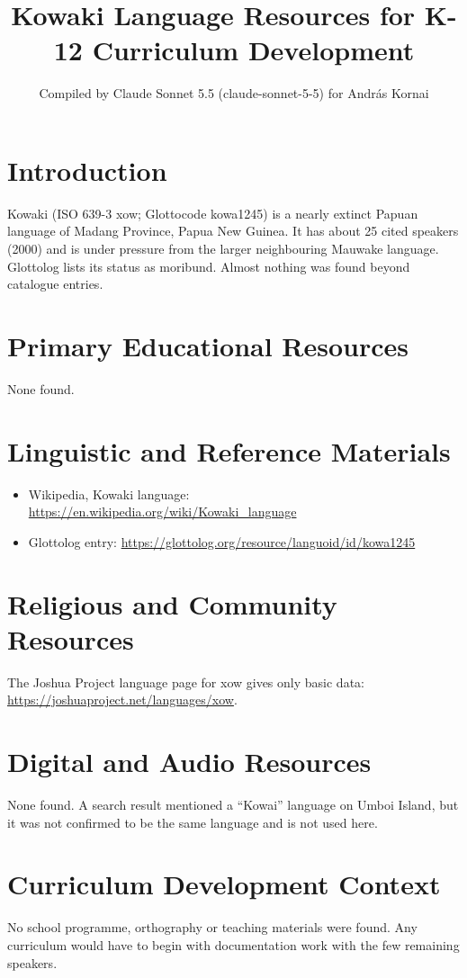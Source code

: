 \documentclass[12pt]{article}
\title{Kowaki Language Resources for K-12 Curriculum Development}
\author{Compiled by Claude Sonnet 5.5 (claude-sonnet-5-5) for Andr\'as Kornai}
\date{}
\begin{document}
\maketitle
\section{Introduction}
Kowaki (ISO 639-3 xow; Glottocode kowa1245) is a nearly extinct Papuan language of Madang Province, Papua New Guinea. It has about 25 cited speakers (2000) and is under pressure from the larger neighbouring Mauwake language. Glottolog lists its status as moribund. Almost nothing was found beyond catalogue entries.

\section{Primary Educational Resources}
None found.

\section{Linguistic and Reference Materials}
\begin{itemize}
\item Wikipedia, Kowaki language: \url{https://en.wikipedia.org/wiki/Kowaki_language}
\item Glottolog entry: \url{https://glottolog.org/resource/languoid/id/kowa1245}
\end{itemize}

\section{Religious and Community Resources}
The Joshua Project language page for xow gives only basic data: \url{https://joshuaproject.net/languages/xow}.

\section{Digital and Audio Resources}
None found. A search result mentioned a ``Kowai'' language on Umboi Island, but it was not confirmed to be the same language and is not used here.

\section{Curriculum Development Context}
No school programme, orthography or teaching materials were found. Any curriculum would have to begin with documentation work with the few remaining speakers.
\end{document}
